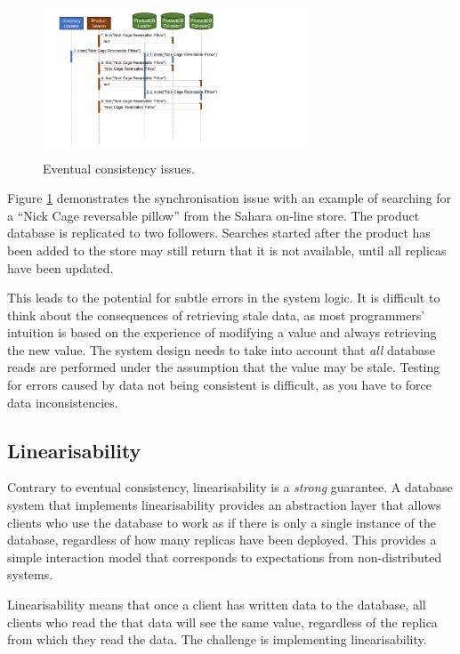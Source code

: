 \begin{figure}[h!]
    \centering
    \includegraphics[trim=60 152 330 18,clip,width=0.7\textwidth]{diagrams/eventual-consistency-seq.png}
    \caption{Eventual consistency issues.}
    \label{fig:eventual-consistency-seq}
\end{figure}

Figure \ref{fig:eventual-consistency-seq} demonstrates the synchronisation issue
with an example of searching for a ``Nick Cage reversable pillow'' from the Sahara on-line store.
The product database is replicated to two followers.
Searches started after the product has been added to the store may still return that it is not available,
until all replicas have been updated.

This leads to the potential for subtle errors in the system logic.
It is difficult to think about the consequences of retrieving stale data,
as most programmers' intuition is based on the experience of modifying a value and always retrieving the new value.
The system design needs to take into account that \emph{all} database reads are performed under the assumption that the value may be stale.
Testing for errors caused by data not being consistent is difficult, as you have to force data inconsistencies.

\newpage
\subsection{Linearisability}

Contrary to eventual consistency, linearisability is a \emph{strong} guarantee.
A database system that implements linearisability provides an abstraction layer
that allows clients who use the database to work as if there is only a single instance of the database,
regardless of how many replicas have been deployed.
This provides a simple interaction model that corresponds to expectations from non-distributed systems.

Linearisability means that once a client has written data to the database,
all clients who read the that data will see the same value, regardless of the replica from which they read the data.
The challenge is implementing linearisability.

